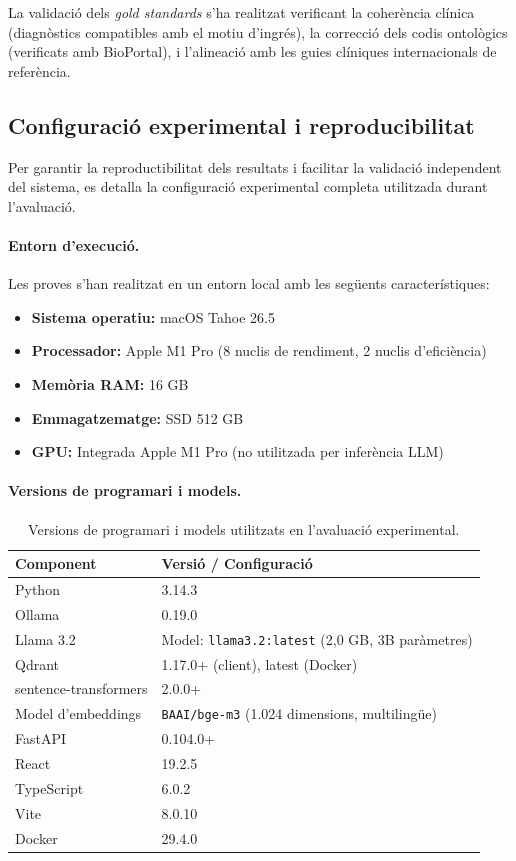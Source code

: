 \documentclass[CAT]{TFUOC}%
\begin{document}
La validació dels \textit{gold standards} s'ha realitzat verificant la coherència clínica (diagnòstics compatibles amb el motiu d'ingrés), la correcció dels codis ontològics (verificats amb BioPortal), i l'alineació amb les guies clíniques internacionals de referència.

\subsection{Configuració experimental i reproducibilitat}

Per garantir la reproductibilitat dels resultats i facilitar la validació independent del sistema, es detalla la configuració experimental completa utilitzada durant l'avaluació.

\paragraph{Entorn d'execució.}
Les proves s'han realitzat en un entorn local amb les següents característiques:
\begin{itemize}
    \item \textbf{Sistema operatiu:} macOS Tahoe 26.5
    \item \textbf{Processador:} Apple M1 Pro (8 nuclis de rendiment, 2 nuclis d'eficiència)
    \item \textbf{Memòria RAM:} 16 GB
    \item \textbf{Emmagatzematge:} SSD 512 GB
    \item \textbf{GPU:} Integrada Apple M1 Pro (no utilitzada per inferència LLM)
\end{itemize}

\paragraph{Versions de programari i models.}
\begin{table}[H]
\centering
\small
\begin{tabular}{lp{10cm}}
\hline
\textbf{Component} & \textbf{Versió / Configuració} \\
\hline
Python & 3.14.3 \\
Ollama & 0.19.0 \\
Llama 3.2 & Model: \texttt{llama3.2:latest} (2,0 GB, 3B paràmetres) \\
Qdrant & 1.17.0+ (client), latest (Docker) \\
sentence-transformers & 2.0.0+ \\
Model d'embeddings & \texttt{BAAI/bge-m3} (1.024 dimensions, multilingüe) \\
FastAPI & 0.104.0+ \\
React & 19.2.5 \\
TypeScript & 6.0.2 \\
Vite & 8.0.10 \\
Docker & 29.4.0 \\
\hline
\end{tabular}
\caption{Versions de programari i models utilitzats en l'avaluació experimental.}
\label{tab:software-versions}
\end{table}
\end{document}
